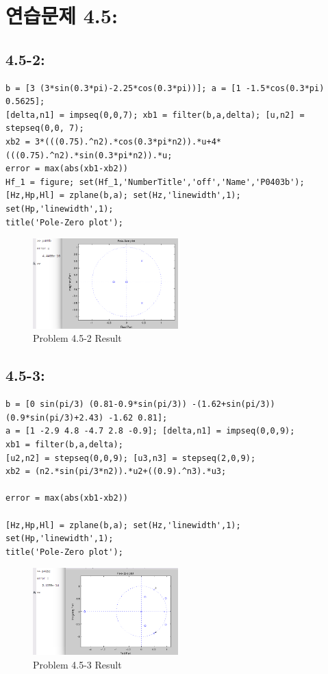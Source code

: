 \documentclass[11pt
  , a4paper
  , article
  , oneside
]{memoir}
\begin{document}
\chapter{연습문제 4.5: }
\section{4.5-2: }
\begin{lstlisting}[style=termstyle]
b = [3 (3*sin(0.3*pi)-2.25*cos(0.3*pi))]; a = [1 -1.5*cos(0.3*pi) 0.5625];
[delta,n1] = impseq(0,0,7); xb1 = filter(b,a,delta); [u,n2] = stepseq(0,0, 7);
xb2 = 3*(((0.75).^n2).*cos(0.3*pi*n2)).*u+4*(((0.75).^n2).*sin(0.3*pi*n2)).*u;
error = max(abs(xb1-xb2))
Hf_1 = figure; set(Hf_1,'NumberTitle','off','Name','P0403b');
[Hz,Hp,Hl] = zplane(b,a); set(Hz,'linewidth',1); set(Hp,'linewidth',1);
title('Pole-Zero plot');
\end{lstlisting}

\begin{figure}[h!]
	\centering
	\includegraphics[width=0.5\textwidth,height=0.25\textwidth]{./images/p405-2.png}
	\caption{Problem 4.5-2 Result}
	\label{fig:Problem 4.5-2 Result}
\end{figure}

\section{4.5-3: }
\begin{lstlisting}[style=termstyle]
b = [0 sin(pi/3) (0.81-0.9*sin(pi/3)) -(1.62+sin(pi/3)) (0.9*sin(pi/3)+2.43) -1.62 0.81];
a = [1 -2.9 4.8 -4.7 2.8 -0.9]; [delta,n1] = impseq(0,0,9);
xb1 = filter(b,a,delta);
[u2,n2] = stepseq(0,0,9); [u3,n3] = stepseq(2,0,9);
xb2 = (n2.*sin(pi/3*n2)).*u2+((0.9).^n3).*u3; 

error = max(abs(xb1-xb2))

[Hz,Hp,Hl] = zplane(b,a); set(Hz,'linewidth',1); set(Hp,'linewidth',1);
title('Pole-Zero plot');
\end{lstlisting}

\begin{figure}[h!]
	\centering
	\includegraphics[width=0.5\textwidth,height=0.25\textwidth]{./images/p405-3.png}
	\caption{Problem 4.5-3 Result}
	\label{fig:Problem 4.5-3 Result}
\end{figure}
\end{document}
